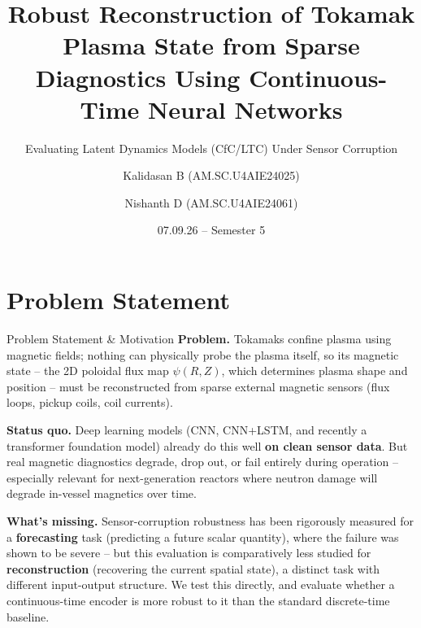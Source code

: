 \documentclass[aspectratio=169]{beamer}
\title[Robust Plasma Reconstruction via Continuous-Time Networks]{Robust Reconstruction of Tokamak Plasma State from Sparse Diagnostics Using Continuous-Time Neural Networks}
\subtitle{Evaluating Latent Dynamics Models (CfC/LTC) Under Sensor Corruption}
\author{Kalidasan B (AM.SC.U4AIE24025) \and Nishanth D (AM.SC.U4AIE24061)}
\institute{School of Computing, Amrita Vishwa Vidyapeetham \\ Supervisor: Dr Simi S, Team Number: 15 }
\date{ 07.09.26 -- Semester 5}
\begin{document}
\begin{frame}
  \titlepage
\end{frame}

\section{Problem Statement}
\begin{frame}{Problem Statement \& Motivation}
  \textbf{Problem.} Tokamaks confine plasma using magnetic fields; nothing
  can physically probe the plasma itself, so its magnetic state -- the 2D
  poloidal flux map $\psi(R,Z)$, which determines plasma shape and position
  -- must be reconstructed from sparse external magnetic sensors (flux
  loops, pickup coils, coil currents).
  \vspace{4pt}

  \textbf{Status quo.} Deep learning models (CNN, CNN+LSTM, and recently a
  transformer foundation model) already do this well \textbf{on clean
  sensor data}. But real magnetic diagnostics degrade, drop out, or fail
  entirely during operation -- especially relevant for next-generation
  reactors where neutron damage will degrade in-vessel magnetics over time.
  \vspace{4pt}

  \textbf{What's missing.} Sensor-corruption robustness has been rigorously
  measured for a \textbf{forecasting} task (predicting a future scalar
  quantity), where the failure was shown to be severe -- but this
  evaluation is comparatively less studied for \textbf{reconstruction}
  (recovering the current spatial state), a distinct task with different
  input-output structure. We test this directly, and evaluate whether a
  continuous-time encoder is more robust to it than the standard
  discrete-time baseline.
\end{frame}

\end{document}
